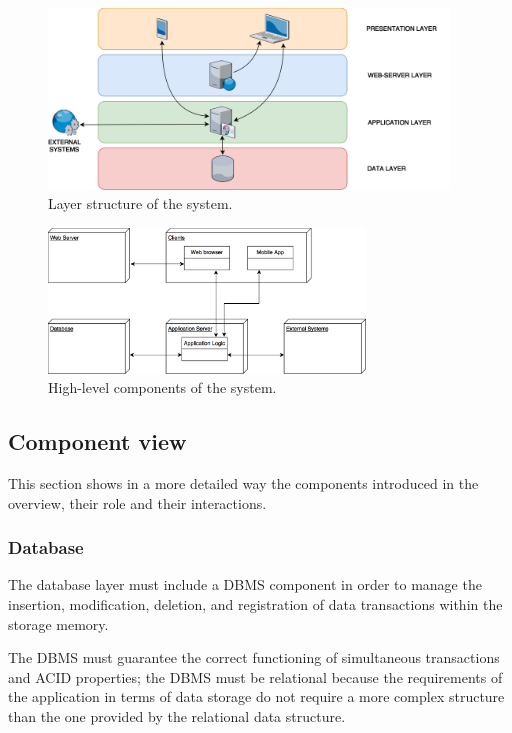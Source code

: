 \documentclass{article}
\begin{document}
	\begin{figure}[!ht]
	\centering
	\includegraphics[width=0.95\textwidth]{img/diagrams/layers.png}
	\caption{Layer structure of the system.}
	\end{figure}

	\bigskip
	\begin{figure}[!ht]
	\centering
	\includegraphics[width=0.75\textwidth]{img/diagrams/hlc.png}
	\caption{High-level components of the system.}
	\end{figure}

	\newpage

	\subsection{Component view}

	This section shows in a more detailed way the components introduced in the overview, their role and their interactions.

	\subsubsection{Database}
	The database layer must include a DBMS component in order to manage the insertion, modification, deletion, and registration of data transactions within the storage memory.
	
	The DBMS must guarantee the correct functioning of simultaneous transactions and ACID properties; the DBMS must be relational because the requirements of the application in terms of data storage do not require a more complex structure than the one provided by the relational data structure.
	
\end{document}
